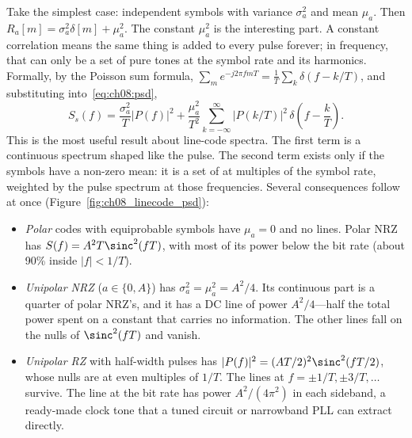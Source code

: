 Take the simplest case: independent symbols with variance $\sigma_a^2$ and mean $\mu_a$. Then
$R_a[m]=\sigma_a^2\delta[m]+\mu_a^2$. The constant $\mu_a^2$ is the interesting part. A
constant correlation means the same thing is added to every pulse forever; in frequency, that
can only be a set of pure tones at the symbol rate and its harmonics. Formally, by the Poisson
sum formula, $\sum_m e^{-j2\pi fmT}=\frac1T\sum_k\delta(f-k/T)$, and substituting
into~\eqref{eq:ch08:psd},
\begin{equation}
S_s(f)=\frac{\sigma_a^2}{T}|P(f)|^2+\frac{\mu_a^2}{T^2}\sum_{k=-\infty}^{\infty}\big|P(k/T)\big|^2\,\delta\!\left(f-\frac kT\right).
\label{eq:ch08:psdlines}
\end{equation}
This is the most useful result about line-code spectra. The first term is a continuous
spectrum shaped like the pulse. The second term exists only if the symbols have a non-zero
mean: it is a set of  at multiples of the symbol rate, weighted by the
pulse spectrum at those frequencies. Several consequences follow at once
(Figure~\ref{fig:ch08_linecode_psd}):
\begin{itemize}
\item \emph{Polar} codes with equiprobable symbols have $\mu_a=0$ and no lines. Polar NRZ has
$S(f)=A^2T\sinc^2(fT)$, with most of its power below the bit rate (about 90\% inside
$|f|<1/T$).
\item \emph{Unipolar NRZ} ($a\in\{0,A\}$) has $\sigma_a^2=\mu_a^2=A^2/4$. Its continuous part is
a quarter of polar NRZ's, and it has a DC line of power $A^2/4$---half the total power
spent on a constant that carries no information. The other lines fall on the nulls of
$\sinc^2(fT)$ and vanish.
\item \emph{Unipolar RZ} with half-width pulses has $|P(f)|^2=(AT/2)^2\sinc^2(fT/2)$, whose
nulls are at even multiples of $1/T$. The lines at $f=\pm1/T,\pm3/T,\dots$ survive. The line
at the bit rate has power $A^2/(4\pi^2)$ in each sideband, a ready-made clock tone that a
tuned circuit or narrowband PLL can extract directly.
\end{itemize}


